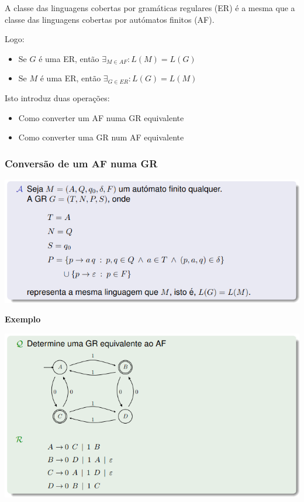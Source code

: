 \documentclass{article}
\begin{document}
\begin{flushleft}
  \item  A classe das linguagens cobertas por gramáticas regulares (ER) é a mesma que a classe das linguagens cobertas por autómatos finitos (AF).
  \item Logo:
  \begin{itemize}
    \item Se $G$ é uma ER, então $\exists_{M \in AF} : L(M) = L(G)$
    \item Se $M$ é uma ER, então $\exists_{G \in ER} : L(G) = L(M)$
  \end{itemize}
  \item Isto introduz duas operações:
  \begin{itemize}
    \item Como converter um AF numa GR equivalente
    \item Como converter uma GR num AF equivalente
  \end{itemize}

  \pagebreak

  \subsubsection{Conversão de um AF numa GR}

  \begin{center}
    \includegraphics[scale=0.4]{86}
  \end{center}

  \textbf{Exemplo}
  \begin{center}
    \includegraphics[scale=0.4]{87}
  \end{center}
\end{flushleft}
\end{document}
